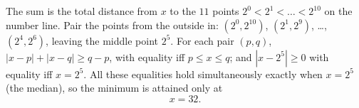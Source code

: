 The sum is the total distance from $x$ to the $11$ points $2^0<2^1<\dots<2^{10}$ on the number line. Pair the points from the outside in: $(2^0,2^{10})$, $(2^1,2^9)$, \dots, $(2^4,2^6)$, leaving the middle point $2^5$. For each pair $(p,q)$, $|x-p|+|x-q|\ge q-p$, with equality iff $p\le x\le q$; and $|x-2^5|\ge0$ with equality iff $x=2^5$. All these equalities hold simultaneously exactly when $x=2^5$ (the median), so the minimum is attained only at
\[
x=\boxed{32}.
\]
